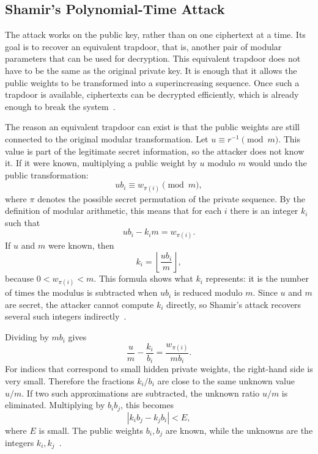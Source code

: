 \subsection{Shamir's Polynomial-Time Attack}

The attack works on the public key, rather than on one ciphertext at a time.
Its goal is to recover an equivalent trapdoor, that is, another pair of modular
parameters that can be used for decryption. This equivalent trapdoor does not
have to be the same as the original private key. It is enough that it allows
the public weights to be transformed into a superincreasing sequence. Once
such a trapdoor is available, ciphertexts can be decrypted efficiently, which
is already enough to break the system~\cite{OdlyzkoRiseFall}.

The reason an equivalent trapdoor can exist is that the public weights are
still connected to the original modular transformation. Let
\(u \equiv r^{-1} \pmod{m}\). This value is part of the legitimate secret
information, so the attacker does not know it. If it were known, multiplying a
public weight by \(u\) modulo \(m\) would undo the public transformation:
\[
    u b_i \equiv w_{\pi(i)} \pmod{m},
\]
where \(\pi\) denotes the possible secret permutation of the private sequence.
By the definition of modular arithmetic, this means that for each \(i\) there
is an integer \(k_i\) such that
\[
    u b_i - k_i m = w_{\pi(i)}.
\]
If \(u\) and \(m\) were known, then
\[
    k_i = \left\lfloor \frac{u b_i}{m} \right\rfloor,
\]
because \(0 < w_{\pi(i)} < m\). This formula shows what \(k_i\) represents: it
is the number of times the modulus is subtracted when \(u b_i\) is reduced
modulo \(m\). Since \(u\) and \(m\) are secret, the attacker cannot compute
\(k_i\) directly, so Shamir's attack recovers several such integers
indirectly~\cite[pp.~145--152]{Shamir1982}.

Dividing by \(m b_i\) gives
\[
    \frac{u}{m} - \frac{k_i}{b_i}
    =
    \frac{w_{\pi(i)}}{m b_i}.
\]
For indices that correspond to small hidden private weights, the right-hand
side is very small. Therefore the fractions \(k_i/b_i\) are close to the same
unknown value \(u/m\). If two such approximations are subtracted, the unknown
ratio \(u/m\) is eliminated. Multiplying by \(b_i b_j\), this becomes
\[
    \left| k_i b_j - k_j b_i \right| < E,
\]
where \(E\) is small. The public weights \(b_i,b_j\) are known, while the
unknowns are the integers \(k_i,k_j\)~\cite{Shamir1982,OdlyzkoRiseFall}.


